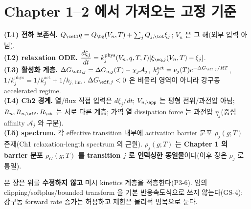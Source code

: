 \section{Chapter 1--2 에서 가져오는 고정 기준}\label{sec:ch3_inherit}
\begin{linkbox}
\textbf{(L1) 전하 보존식.} $Q_\cell q=Q_\bg(V_n,T)+\sum_j Q_{j,\tot}\xi_j$; $V_n$ 은 그 해(외부 입력 아님).\\
\textbf{(L2) relaxation ODE.} $\dfrac{d\xi_j}{dt}=k_j^{\mathrm{phys}}(V_n,q,T,I)[\xi_{\eq,j}(V_n,T)-\xi_j]$.\\
\textbf{(L3) 활성화 계층.} $\Delta G_{\eff,j}=\Delta G_{a,j}(T)-\chi_j\mathcal A_j$,
$k_j^{\mathrm{act}}=\nu_j(T)e^{-\Delta G_{\eff,j}/RT}$, $1/k_j^{\mathrm{phys}}=1/k_j^{\mathrm{act}}+1/k_{j,\lim}$.
$\Delta G_{\eff,j}<0$ 은 비물리 영역이 아니라 강구동 accelerated regime.\\
\textbf{(L4) Ch2 경계.} 열/flux 직접 입력은 $d\xi_j/dt$; $V_{n,\app}$ 는 평형 전위/과전압 아님;
$R_n,R_{n,\eff},R_{\ct}$ 는 서로 다른 계층; 가역 열 dissipation force 는 과전압 $\eta_j$(중심 affinity
$\mathcal A_j$ 와 구분).\\
\textbf{(L5) spectrum.} 각 effective transition 내부에 activation barrier 분포 $\rho_j(g;T)$ 존재(Ch1
relaxation-length spectrum 의 근원). $\rho_j(g;T)$ 는 \textbf{Chapter 1 의 barrier 분포 $\rho_G(g;T)$ 를
transition $j$ 로 인덱싱한 동일물}이다(이후 장은 $\rho_j$ 로 통일).
\end{linkbox}
본 장은 위를 \textbf{수정하지 않고} 미시 kinetics 계층을 적층한다(P3-6). 임의 clipping/softplus/bounded
transform 을 기본 반응속도식으로 쓰지 않는다(GS-4); 강구동 forward rate 증가는 허용하고 제한은 물리적 병목으로 둔다.

